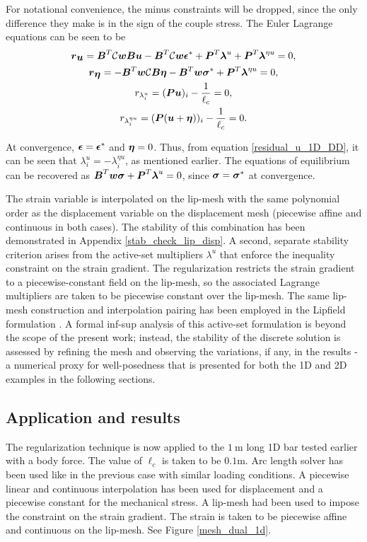 \documentclass[10pt]{cas-sc}
\newenvironment{addedblock}
{\begingroup\color{blue!80}}
{\endgroup}
\begin{document}
For notational convenience, the minus constraints will be dropped, since the only difference they make is in the sign of the couple stress. The Euler Lagrange equations can be seen to be
\begin{gather}
	\mbox{\boldmath $r$}_{\mbox{\boldmath $u$}} = \mbox{\boldmath $B$}^T \mathcal{C}\mbox{\boldmath $w$} \mbox{\boldmath $B$} \mbox{\boldmath $u$} - \mbox{\boldmath $B$}^T \mathcal{C}\mbox{\boldmath $w$} \mbox{\boldmath $\epsilon$} ^* + \mbox{\boldmath $P$}^T \mbox{\boldmath $\lambda$}^u +\mbox{\boldmath $P$}^T \mbox{\boldmath $\lambda$}^{\eta u}  =0, \label{residual_u_1D_DD} \\
	\mbox{\boldmath $r$}_{\mbox{\boldmath $\eta$}} = -\mbox{\boldmath $B$}^T\mbox{\boldmath $w$} \mathcal{C} \mbox{\boldmath $B$} \mbox{\boldmath $\eta$} - \mbox{\boldmath $B$}^T\mbox{\boldmath $w$} \mbox{\boldmath $\sigma$} ^* +\mbox{\boldmath $P$}^T \mbox{\boldmath $\lambda$}^{\eta u} =0, \\
	r_{\lambda^u_i} =  (\mbox{\boldmath $P$} \mbox{\boldmath $u$})_i - \frac{1}{\ell_c}  =0, \\
	r_{\lambda^{\eta u}_i} =  (\mbox{\boldmath $P$} (\mbox{\boldmath $u$} + \mbox{\boldmath $\eta$}))_i - \frac{1}{\ell_c}  =0. 
\end{gather}

At convergence, $\mbox{\boldmath $\epsilon$}=\mbox{\boldmath $\epsilon$}^*$ and $\mbox{\boldmath $\eta$}=0$. Thus, from equation \ref{residual_u_1D_DD}, it can be seen that $\lambda^u_i = -\lambda^{\eta u}_i$, as mentioned earlier. The equations of equilibrium can be recovered as $\mbox{\boldmath $B$}^T \mbox{\boldmath $w$} \mbox{\boldmath $\sigma$} +\mbox{\boldmath $P$}^T \mbox{\boldmath $\lambda$}^{u} =0$, since $\mbox{\boldmath $\sigma$} = \mbox{\boldmath $\sigma$}^*$ at convergence.


\begin{addedblock}
The strain variable is interpolated on the lip-mesh with the same polynomial order as the displacement variable on the displacement mesh (piecewise affine and continuous in both cases). The stability of this combination has been demonstrated in Appendix \ref{stab_check_lip_disp}. A second, separate stability criterion arises from the active-set multipliers $\lambda^u$ that enforce the inequality constraint on the strain gradient. The regularization restricts the strain gradient to a piecewise-constant field on the lip-mesh, so the associated Lagrange multipliers are taken to be piecewise constant over the lip-mesh. The same lip-mesh construction and interpolation pairing has been employed in the Lipfield formulation \cite{Chevaugeon2021}. A formal inf-sup analysis of this active-set formulation is beyond the scope of the present work; instead, the stability of the discrete solution is assessed by refining the mesh and observing the variations, if any, in the results - a numerical proxy for well-posedness that is presented for both the 1D and 2D examples in the following sections.
\end{addedblock}

\subsection{Application and results}
The regularization technique is now applied to the $\SI{1}{\meter}$ long 1D bar tested earlier with a body force. The value of $\ell_c$ is taken to be $0.1\si{\meter}$. Arc length solver has been used like in the previous case with similar loading conditions. A piecewise linear and continuous interpolation has been used for displacement and a piecewise constant for the mechanical stress. A lip-mesh had been used to impose the constraint on the strain gradient. The strain is taken to be piecewise affine and continuous on the lip-mesh. See Figure \ref{mesh_dual_1d}. 
\end{document}
